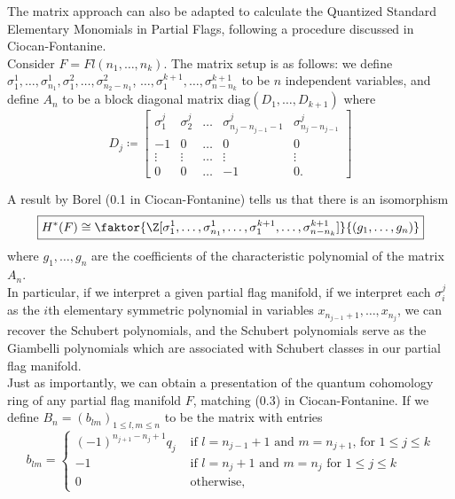 \documentclass[11pt]{article}
\begin{document}
\vspace{0.25cm}

The matrix approach can also be adapted to calculate the Quantized Standard Elementary Monomials in Partial Flags, following a procedure discussed in Ciocan-Fontanine. \\

Consider $F = Fl(n_1, \dots, n_k)$. The matrix setup is as follows: we define $\sigma_1^1, \dots, \sigma_{n_1}^1, \sigma_1^2, \dots, \sigma_{n_2 - n_1}^2$, $\dots, \sigma_1^{k+1}, \dots, \sigma_{n-n_k}^{k+1}$ to be $n$ independent variables, and define $A_n$ to be a block diagonal matrix $\mathrm{diag}(D_1, \dots, D_{k+1})$ where
\[
    D_j \coloneqq \begin{bmatrix}
        \sigma_1^j & \sigma_2^j & \dots & \sigma_{n_j - n_{j-1} - 1}^j & \sigma_{n_j - n_{j-1}}^j \\
        -1 & 0 & \dots & 0 & 0 \\
        \vdots & \vdots & \dots & \vdots & \vdots \\
        0 & 0 & \dots & -1 & 0.
    \end{bmatrix}
\]

A result by Borel (0.1 in Ciocan-Fontanine) tells us that there is an isomorphism 
\[
    \boxed{H^*(F) \cong \faktor{\Z[\sigma_1^1, \dots, \sigma_{n_1}^1, \dots, \sigma_1^{k+1}, \dots, \sigma_{n-n_k}^{k+1}]}{(g_1, \dots, g_n)}}
\]
where $g_1, \dots, g_n$ are the coefficients of the characteristic polynomial of the matrix $A_n$. \\

In particular, if we interpret a given partial flag manifold, if we interpret each $\sigma_i^j$ as the $i$th elementary symmetric polynomial in variables $x_{n_{j-1} + 1}, \dots, x_{n_j}$, we can recover the Schubert polynomials, and the Schubert polynomials serve as the Giambelli polynomials which are associated with Schubert classes in our partial flag manifold. \\

Just as importantly, we can obtain a  presentation of the quantum cohomology ring of any partial flag manifold $F$, matching (0.3) in Ciocan-Fontanine. If we define $B_n = (b_{lm})_{1 \leq l, m \leq n}$ to be the matrix with entries
\[
b_{lm} = \begin{cases}
    (-1)^{n_{j+1} - n_j + 1} q_j & \text{ if $l = n_{j-1} + 1$ and $m = n_{j+1}$, for $1 \leq j \leq k$} \\
    -1 & \text{ if $l = n_{j} + 1$ and $m = n_{j}$ for $1 \leq j \leq k$} \\
    0 & \text{ otherwise},
\end{cases}
\]
\end{document}
